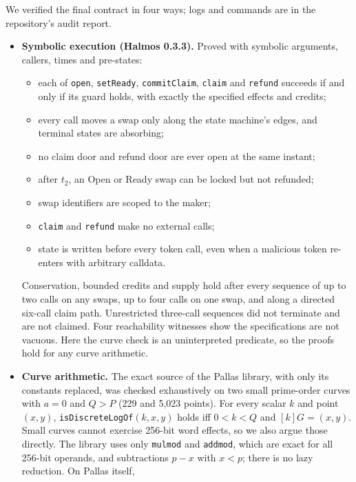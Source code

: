 \documentclass[10pt,letterpaper]{article}
\makeatletter
\renewcommand\subsection{\@startsection{subsection}{2}{\z@}{-0.9em}{0.25em}{\normalfont\normalsize\bfseries}}
\theoremstyle{plain}
\theoremstyle{definition}
\newcommand{\fn}[1]{\texttt{#1}}
\newcommand{\st}[1]{\textsf{#1}}
\makeatother
\begin{document}
\subsection{The escrow contract}
We verified the final contract in four ways; logs and commands are in the repository's audit
report.
\begin{itemize}\setlength\itemsep{0.1em}
\item \textbf{Symbolic execution (Halmos 0.3.3).} Proved with symbolic arguments, callers, times
and pre-states:
\begin{itemize}\setlength\itemsep{0.05em}
\item each of \fn{open}, \fn{setReady}, \fn{commitClaim}, \fn{claim} and \fn{refund} succeeds if
and only if its guard holds, with exactly the specified effects and credits;
\item every call moves a swap only along the state machine's edges, and terminal states are
absorbing;
\item no claim door and refund door are ever open at the same instant;
\item after $t_2$, an \st{Open} or \st{Ready} swap can be locked but not refunded;
\item swap identifiers are scoped to the maker;
\item \fn{claim} and \fn{refund} make no external calls;
\item state is written before every token call, even when a malicious token re-enters with
arbitrary calldata.
\end{itemize}
Conservation, bounded credits and supply hold after every sequence of up to two calls on any
swaps, up to four calls on one swap, and along a directed six-call claim path. Unrestricted
three-call sequences did not terminate and are not claimed. Four reachability witnesses show the
specifications are not vacuous. Here the curve check is an uninterpreted predicate, so the proofs
hold for any curve arithmetic.
\item \textbf{Curve arithmetic.} The exact source of the Pallas library, with only its constants
replaced, was checked exhaustively on two small prime-order curves with $a=0$ and $Q>P$ (229 and
5{,}023 points). For every scalar $k$ and point $(x,y)$, \fn{isDiscreteLogOf}$(k,x,y)$ holds iff
$0<k<Q$ and $[k]G=(x,y)$. Small curves cannot exercise 256-bit word effects, so we also argue
those directly. The library uses only \fn{mulmod} and \fn{addmod}, which are exact for all 256-bit
operands, and subtractions $p - x$ with $x < p$; there is no lazy reduction. On Pallas itself,

\end{itemize}
\end{document}
